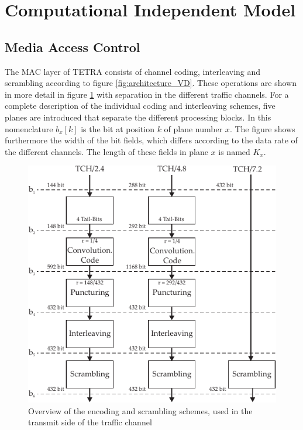 \section{Computational Independent Model}
\label{sec:TETRA_CIM}
\subsection{Media Access Control}
The \ac{MAC} layer of TETRA consists of channel coding, interleaving and scrambling according to figure \ref{fig:architecture_VD}. These operations are shown in more detail in figure \ref{fig:MAC_TETRA} with separation in the different traffic channels. For a complete description of the individual coding and interleaving schemes, five planes are introduced that separate the different processing blocks. In this nomenclature $b_x[k]$ is the bit at position $k$ of plane number $x$. The figure shows furthermore the width of the bit fields, which differs according to the data rate of the different channels. The length of these fields in plane $x$ is named $K_x$. 

\begin{figure}[htb]
	\centering
		\includegraphics[]{../kapitel04/figures/MAC_TETRA.pdf}
	\caption{Overview of the encoding and scrambling schemes, used in the transmit side of the traffic channel}
	\label{fig:MAC_TETRA}
\end{figure}


